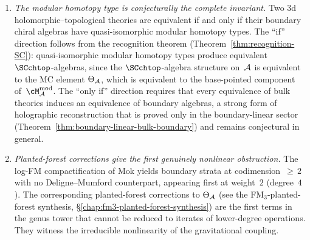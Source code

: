 \begin{remark}
\begin{enumerate}[label=(\alph*),leftmargin=1.8em]
\item
\emph{The modular homotopy type is conjecturally the complete invariant.}
Two 3d holomorphic--topological theories are equivalent if
and only if their boundary chiral algebras have
quasi-isomorphic modular homotopy types.
The ``if'' direction follows from the recognition theorem
(Theorem~\ref{thm:recognition-SC}): quasi-isomorphic modular
homotopy types produce equivalent $\SCchtop$-algebras, since
the $\SCchtop$-algebra structure on~$\mathcal{A}$ is equivalent to the
MC element $\Theta_{\mathcal{A}}$, which is equivalent to the
base-pointed component of~$\cM^{\mathrm{mod}}_\cA$.
The ``only if'' direction requires that every equivalence of
bulk theories induces an equivalence of boundary algebras,
a strong form of holographic reconstruction that is proved
only in the boundary-linear sector
(Theorem~\ref{thm:boundary-linear-bulk-boundary}) and remains
conjectural in general.
\ClaimStatusConjectured

\item
\emph{Planted-forest corrections give the first genuinely
nonlinear obstruction.}
The log-FM compactification of Mok yields boundary strata at
codimension~${\ge}\,2$ with no Deligne--Mumford counterpart,
appearing first at weight~$2$ (degree~$4$). The corresponding
planted-forest corrections to $\Theta_{\mathcal{A}}$ (see the
FM$_3$-planted-forest synthesis,
\S\ref{chap:fm3-planted-forest-synthesis}) are the first terms
in the genus tower that cannot be reduced to iterates of
lower-degree operations. They witness the irreducible
nonlinearity of the gravitational coupling.
\end{enumerate}
\end{remark}

